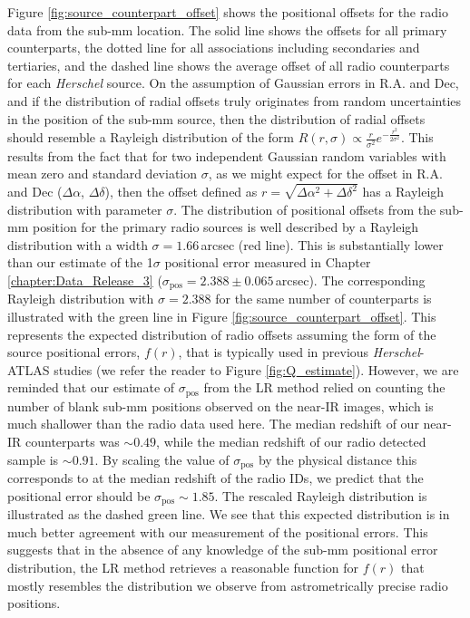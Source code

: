 Figure \ref{fig:source_counterpart_offset} shows the positional offsets for the radio data from the sub-mm location. The solid line shows the offsets for all primary counterparts, the dotted line for all associations including secondaries and tertiaries, and the dashed line shows the average offset of all radio counterparts for each \textit{Herschel} source. On the assumption of Gaussian errors in R.A. and Dec, and if the distribution of radial offsets truly originates from random uncertainties in the position of the sub-mm source, then the distribution of radial offsets should resemble a Rayleigh distribution of the form $R(r, \sigma) \propto \frac{r}{\sigma^2}e^{-\frac{r^2}{2\sigma^2}}$. This results from the fact that for two independent Gaussian random variables with mean zero and standard deviation $\sigma$, as we might expect for the offset in R.A. and Dec ($\Delta\alpha$, $\Delta\delta$), then the offset defined as $r = \sqrt{\Delta\alpha^2 + \Delta\delta^2}$ has a Rayleigh distribution with parameter $\sigma$. The distribution of positional offsets from the sub-mm position for the primary radio sources is well described by a Rayleigh distribution with a width $\sigma = 1.66\,$arcsec (red line). This is substantially lower than our estimate of the 1$\sigma$ positional error measured in Chapter \ref{chapter:Data_Release_3} ($\sigma_{\textrm{pos}} = 2.388\pm0.065$\,arcsec). The corresponding Rayleigh distribution with $\sigma = 2.388$ for the same number of counterparts is illustrated with the green line in Figure \ref{fig:source_counterpart_offset}. This represents the expected distribution of radio offsets assuming the form of the source positional errors, $f(r)$, that is typically used in previous \textit{Herschel}-ATLAS studies (we refer the reader to Figure \ref{fig:Q_estimate}). However, we are reminded that our estimate of $\sigma_{\textrm{pos}}$ from the LR method relied on counting the number of blank sub-mm positions observed on the near-IR images, which is much shallower than the radio data used here. The median redshift of our near-IR counterparts was $\sim 0.49$, while the median redshift of our radio detected sample is $\sim 0.91$. By scaling the value of $\sigma_{\textrm{pos}}$ by the physical distance this corresponds to at the median redshift of the radio IDs, we predict that the positional error should be $\sigma_{\textrm{pos}} \sim 1.85$. The rescaled Rayleigh distribution is illustrated as the dashed green line. We see that this expected distribution is in much better agreement with our measurement of the positional errors. This suggests that in the absence of any knowledge of the sub-mm positional error distribution, the LR method retrieves a reasonable function for $f(r)$ that mostly resembles the distribution we observe from astrometrically precise radio positions.


